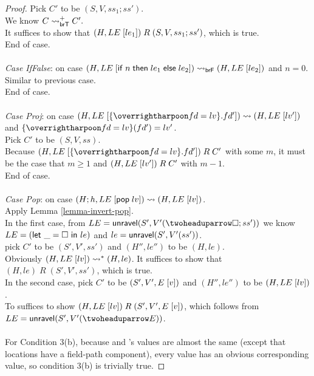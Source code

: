 \begin{proof}
  Pick $C'$ to be $(S, V, ss_1;ss')$. \\
  We know $C\leadsto^+_{\text{\textsf{brT}}} C'.$ \\
  It suffices to show that $(H, LE\;[le_1])\;R\;(S, V, ss_1;ss')$, which is true. \\
  End of case. \\
  \\
  \emph{Case IfFalse}: on case $(H, LE\;[\text{\textsf{if}}\;n\;\text{\textsf{then}}\;le_1\;\text{\textsf{else}}\;le_2])\leadsto_{\text{\textsf{brF}}} (H, LE\;[le_2])$ and $n=0$. \\
  Similar to previous case. \\
  End of case. \\
  \\
  \emph{Case Proj}: on case $(H, \fplug{LE}{\{\ls{fd=lv}\}.fd'})\step(H, \fplug{LE}{lv'})$ and $\{\ls{fd=lv}\}(fd')=lv'$. \\
  Pick $C'$ to be $(S, V, ss)$. \\
  Because $(H, \fplug{LE}{\{\ls{fd=lv}\}.fd'})\;R\;C'$ with some $m$, it must be the case that $m\geq 1$ and $(H, LE\;[lv'])\;R\;C'$ with $m-1$. \\
  End of case. \\
  \\
  \emph{Case Pop}: on case $(H;h, LE\;[\text{\textsf{pop}}\;lv])\leadsto(H, LE\;[lv])$. \\
  Apply Lemma \ref{lemma-invert-pop}. \\
  In the first case, from $LE=\unravel(S', V'(\ctolowE{\symhole;ss'}))$ we know $LE=(\text{\textsf{let}}\ \_=\Box\ \text{\textsf{in}}\ le)$ and $le=\text{\textsf{unravel}}(S',V'(ss'))$. \\
  pick $C'$ to be $(S',V',ss')$ and $(H'', le'')$ to be $(H, le)$. \\
  Obviously $(H, LE\;[lv])\leadsto^*(H, le)$. It suffices to show that $(H,le)\;R\;(S',V',ss')$, which is true. \\
  In the second case, pick $C'$ to be $(S',V',E\;[v])$ and $(H'', le'')$ to be $(H, LE\;[lv])$. \\
  To suffices to show $(H, LE\;[lv])\;R\;(S', V', E\;[v])$, which follows from $LE=\unravel(S',V'(\ctolowE{E}))$. \\
  \\
  For Condition 3(b), because \lamstar and \cstar's values are almost the same (except that \cstar locations have a field-path component), every \lamstar value has an obvious corresponding \cstar value, so condition 3(b) is trivially true.
\end{proof}

